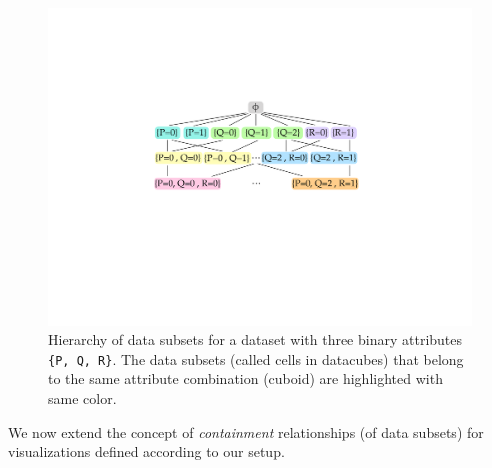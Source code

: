 \begin{figure}[ht!]
\includegraphics[width=\linewidth]{figures/lattice_formal.pdf}
\caption{Hierarchy of data subsets for a dataset with three binary attributes {\tt \{P, Q, R\}}. The data subsets (called cells in datacubes) that belong to the same attribute combination (cuboid) are highlighted with same color.}
\label{fig:lattice}
\end{figure}
We now extend the concept of \emph{containment} relationships (of data subsets) for visualizations defined according to our setup. 

